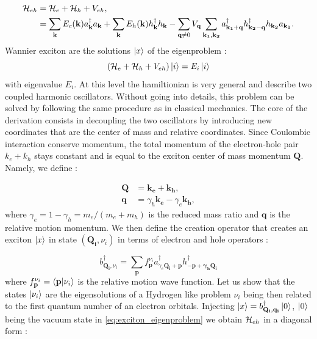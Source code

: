 \begin{equation}
    \begin{align}
    \mathcal{H}_{eh} &= \mathcal{H}_e + \mathcal{H}_h + V_{eh}, \\
              &= \sum_{\mathbf{k}}E_c(\mathbf{k}) a^{\dagger}_{\mathbf{k}}a_{\mathbf{k}} + \sum_{\mathbf{k}}E_h(\mathbf{k}) h^{\dagger}_{\mathbf{k}}h_{\mathbf{k}} - \sum_{\textbf{q}\neq 0}V_{\mathbf{q}} \sum_{\mathbf{k_{1}, k_{2}}} a^{\dagger}_{\mathbf{k_1+q}}h^{\dagger}_{\mathbf{k_2-q}}h_{\mathbf{k_2}}a_{\mathbf{k_1}}.
    \label{eq:electron_hole_hamiltonian}
    \end{align}
\end{equation}
Wannier exciton are the solutions $\ket{x}$ of the eigenproblem :
\begin{equation}
    (\mathcal{H}_e + \mathcal{H}_h + V_{eh})\ket{i}= E_i\ket{i}
    \label{eq:exciton_eigenproblem}
\end{equation}
with eigenvalue $E_i$.
At this level the hamiltionian is very general and describe two coupled harmonic oscillators. Without going into details, this problem can be solved by following the same procedure as in classical mechanics.
The core of the derivation consists in decoupling the two oscillators by introducing new coordinates that are the center of mass and relative coordinates. Since Coulombic interaction conserve momentum, the total momentum of the
electron-hole pair $k_e+k_h$ stays constant and is equal to the exciton center of mass momentum $\mathbf{Q}$. Namely, we define :

\begin{subequations}
    \begin{align}
        \mathbf{Q} &= \mathbf{k_e} + \mathbf{k_h}, \\
        \mathbf{q} &= \gamma_h\mathbf{k_e} - \gamma_e\mathbf{k_h},
    \end{align}
\end{subequations}
where $\gamma_e =1- \gamma_h= m_e/(m_e+m_h)$ is the reduced mass ratio and $\mathbf{q}$ is the relative motion momentum. We then define the creation operator that creates an exciton $\ket{x}$ in state $(\mathbf{Q_i}, \nu_i)$ in terms of electron and hole operators : 

\begin{equation}
    b^{\dagger}_{\mathbf{Q_i},\nu_i} =  \sum_{\mathbf{p}}f_{\mathbf{p}}^{\nu_i}a^{\dagger}_{\gamma_e\mathbf{Q_i}+\mathbf{p}}h^{\dagger}_{\mathbf{-p+\gamma_h\mathbf{Q_i}}}
\end{equation}
\bigskip
\noindent where $f_{\mathbf{p}}^{\nu_i} = \bra{\mathbf{p}}\ket{\nu_i}$ is the relative motion wave function. Let us show that the states $\ket{\nu_i}$ are the eigensolutions of a Hydrogen like problem $\nu_i$ being then related to the first quantum number of an electron orbitals. Injecting $\ket{x}= b^{\dagger}_{\mathbf{Q_i},\mathbf{q_i}}\ket{0}$, $\ket{0}$ being the vacuum state in 
\autoref{eq:exciton_eigenproblem} we obtain $\mathcal{H}_{eh}$ in a diagonal form :

